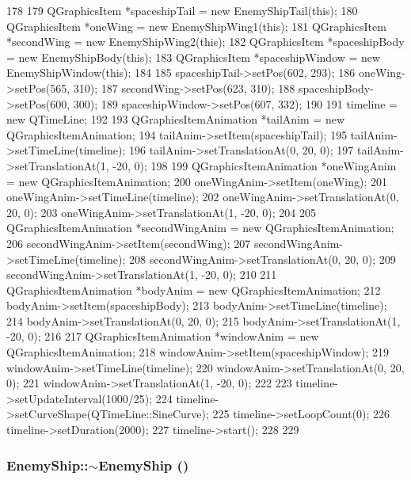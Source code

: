\begin{DoxyCode}
178 {
179     QGraphicsItem *spaceshipTail = new EnemyShipTail(this);
180     QGraphicsItem *oneWing = new EnemyShipWing1(this);
181     QGraphicsItem *secondWing = new EnemyShipWing2(this);
182     QGraphicsItem *spaceshipBody = new EnemyShipBody(this);
183     QGraphicsItem *spaceshipWindow = new EnemyShipWindow(this);
184 
185     spaceshipTail->setPos(602, 293);
186     oneWing->setPos(565, 310);
187     secondWing->setPos(623, 310);
188     spaceshipBody->setPos(600, 300);
189     spaceshipWindow->setPos(607, 332);
190 
191     timeline = new QTimeLine;
192 
193     QGraphicsItemAnimation *tailAnim = new QGraphicsItemAnimation;
194     tailAnim->setItem(spaceshipTail);
195     tailAnim->setTimeLine(timeline);
196     tailAnim->setTranslationAt(0, 20, 0);
197     tailAnim->setTranslationAt(1, -20, 0);
198 
199     QGraphicsItemAnimation *oneWingAnim = new QGraphicsItemAnimation;
200     oneWingAnim->setItem(oneWing);
201     oneWingAnim->setTimeLine(timeline);
202     oneWingAnim->setTranslationAt(0, 20, 0);
203     oneWingAnim->setTranslationAt(1, -20, 0);
204 
205     QGraphicsItemAnimation *secondWingAnim = new QGraphicsItemAnimation;
206     secondWingAnim->setItem(secondWing);
207     secondWingAnim->setTimeLine(timeline);
208     secondWingAnim->setTranslationAt(0, 20, 0);
209     secondWingAnim->setTranslationAt(1, -20, 0);
210 
211     QGraphicsItemAnimation *bodyAnim = new QGraphicsItemAnimation;
212     bodyAnim->setItem(spaceshipBody);
213     bodyAnim->setTimeLine(timeline);
214     bodyAnim->setTranslationAt(0, 20, 0);
215     bodyAnim->setTranslationAt(1, -20, 0);
216 
217     QGraphicsItemAnimation *windowAnim = new QGraphicsItemAnimation;
218     windowAnim->setItem(spaceshipWindow);
219     windowAnim->setTimeLine(timeline);
220     windowAnim->setTranslationAt(0, 20, 0);
221     windowAnim->setTranslationAt(1, -20, 0);
222 
223     timeline->setUpdateInterval(1000/25);
224     timeline->setCurveShape(QTimeLine::SineCurve);
225     timeline->setLoopCount(0);
226     timeline->setDuration(2000);
227     timeline->start();
228 
229 }
\end{DoxyCode}
\hypertarget{class_enemy_ship_a1ac35529a92de9465e7d0a65c7060220}{
\subsubsection[{$\sim$EnemyShip}]{\setlength{\rightskip}{0pt plus 5cm}EnemyShip::$\sim$EnemyShip ()}}
\label{class_enemy_ship_a1ac35529a92de9465e7d0a65c7060220}


